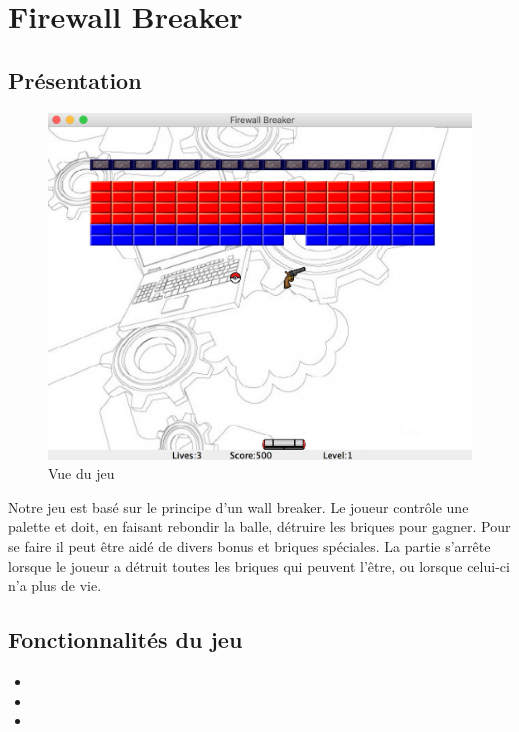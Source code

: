 \documentclass[a4paper,11pt]{article}
\begin{document}
\section{Firewall Breaker}
\subsection{Présentation}
\FloatBarrier
		\begin{figure}[!h]
    		\begin{center}
	   	  	\includegraphics[scale= 0.5]{images/gameView.png}
          	\caption{Vue du jeu}
    		\end{center}
		\end{figure}
\FloatBarrier
Notre jeu est basé sur le principe d'un wall breaker. Le joueur contrôle une palette et doit, en faisant rebondir la balle, détruire les briques pour gagner.
Pour se faire il peut être aidé de divers bonus et briques spéciales. La partie s'arrête lorsque le joueur a détruit toutes les briques qui peuvent l'être, ou lorsque celui-ci n'a plus de vie.

\subsection{Fonctionnalités du jeu}
\begin{itemize}
\item 
\item
\item
\end{itemize}
\end{document}
